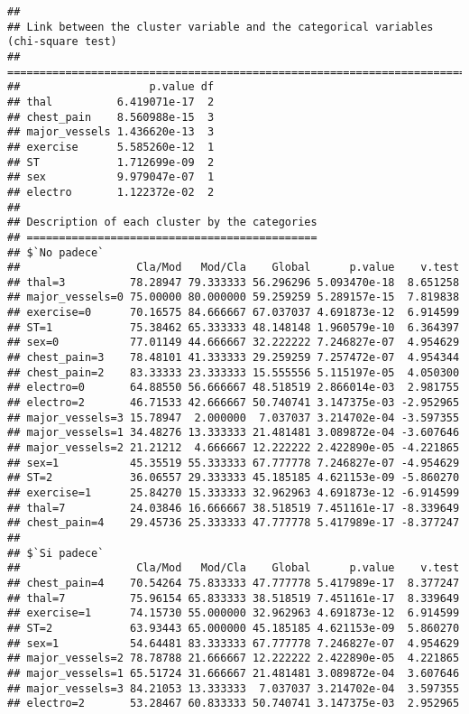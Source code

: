 \documentclass[]{article}
\begin{document}
\begin{verbatim}
## 
## Link between the cluster variable and the categorical variables (chi-square test)
## =================================================================================
##                    p.value df
## thal          6.419071e-17  2
## chest_pain    8.560988e-15  3
## major_vessels 1.436620e-13  3
## exercise      5.585260e-12  1
## ST            1.712699e-09  2
## sex           9.979047e-07  1
## electro       1.122372e-02  2
## 
## Description of each cluster by the categories
## =============================================
## $`No padece`
##                  Cla/Mod   Mod/Cla    Global      p.value    v.test
## thal=3          78.28947 79.333333 56.296296 5.093470e-18  8.651258
## major_vessels=0 75.00000 80.000000 59.259259 5.289157e-15  7.819838
## exercise=0      70.16575 84.666667 67.037037 4.691873e-12  6.914599
## ST=1            75.38462 65.333333 48.148148 1.960579e-10  6.364397
## sex=0           77.01149 44.666667 32.222222 7.246827e-07  4.954629
## chest_pain=3    78.48101 41.333333 29.259259 7.257472e-07  4.954344
## chest_pain=2    83.33333 23.333333 15.555556 5.115197e-05  4.050300
## electro=0       64.88550 56.666667 48.518519 2.866014e-03  2.981755
## electro=2       46.71533 42.666667 50.740741 3.147375e-03 -2.952965
## major_vessels=3 15.78947  2.000000  7.037037 3.214702e-04 -3.597355
## major_vessels=1 34.48276 13.333333 21.481481 3.089872e-04 -3.607646
## major_vessels=2 21.21212  4.666667 12.222222 2.422890e-05 -4.221865
## sex=1           45.35519 55.333333 67.777778 7.246827e-07 -4.954629
## ST=2            36.06557 29.333333 45.185185 4.621153e-09 -5.860270
## exercise=1      25.84270 15.333333 32.962963 4.691873e-12 -6.914599
## thal=7          24.03846 16.666667 38.518519 7.451161e-17 -8.339649
## chest_pain=4    29.45736 25.333333 47.777778 5.417989e-17 -8.377247
## 
## $`Si padece`
##                  Cla/Mod   Mod/Cla    Global      p.value    v.test
## chest_pain=4    70.54264 75.833333 47.777778 5.417989e-17  8.377247
## thal=7          75.96154 65.833333 38.518519 7.451161e-17  8.339649
## exercise=1      74.15730 55.000000 32.962963 4.691873e-12  6.914599
## ST=2            63.93443 65.000000 45.185185 4.621153e-09  5.860270
## sex=1           54.64481 83.333333 67.777778 7.246827e-07  4.954629
## major_vessels=2 78.78788 21.666667 12.222222 2.422890e-05  4.221865
## major_vessels=1 65.51724 31.666667 21.481481 3.089872e-04  3.607646
## major_vessels=3 84.21053 13.333333  7.037037 3.214702e-04  3.597355
## electro=2       53.28467 60.833333 50.740741 3.147375e-03  2.952965

\end{verbatim}
\end{document}
